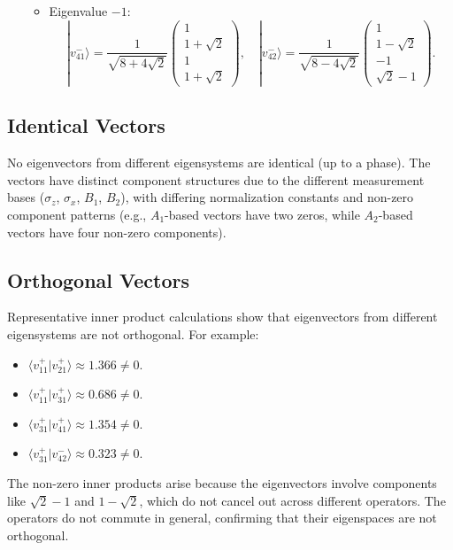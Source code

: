 \documentclass{article}
\begin{document}
\begin{itemize}
\begin{itemize}
\[        \]
        \item Eigenvalue \( -1 \):
        \[
        |v_{41}^-\rangle = \frac{1}{\sqrt{8+4\sqrt{2}}} \begin{pmatrix} 1 \\ 1+\sqrt{2} \\ 1 \\ 1+\sqrt{2} \end{pmatrix}, \quad |v_{42}^-\rangle = \frac{1}{\sqrt{8-4\sqrt{2}}} \begin{pmatrix} 1 \\ 1-\sqrt{2} \\ -1 \\ \sqrt{2}-1 \end{pmatrix}.
        \]
    \end{itemize}
\end{itemize}

\subsection*{Identical Vectors}
No eigenvectors from different eigensystems are identical (up to a phase). The vectors have distinct component structures due to the different measurement bases (\( \sigma_z \), \( \sigma_x \), \( B_1 \), \( B_2 \)), with differing normalization constants and non-zero component patterns (e.g., \( A_1 \)-based vectors have two zeros, while \( A_2 \)-based vectors have four non-zero components).

\subsection*{Orthogonal Vectors}
Representative inner product calculations show that eigenvectors from different eigensystems are not orthogonal. For example:
\begin{itemize}
    \item \( \langle v_{11}^+ | v_{21}^+ \rangle \approx 1.366 \neq 0 \).
    \item \( \langle v_{11}^+ | v_{31}^+ \rangle \approx 0.686 \neq 0 \).
    \item \( \langle v_{31}^+ | v_{41}^+ \rangle \approx 1.354 \neq 0 \).
    \item \( \langle v_{31}^+ | v_{42}^- \rangle \approx 0.323 \neq 0 \).
\end{itemize}
The non-zero inner products arise because the eigenvectors involve components like \( \sqrt{2}-1 \) and \( 1-\sqrt{2} \), which do not cancel out across different operators. The operators do not commute in general, confirming that their eigenspaces are not orthogonal.
\end{document}
